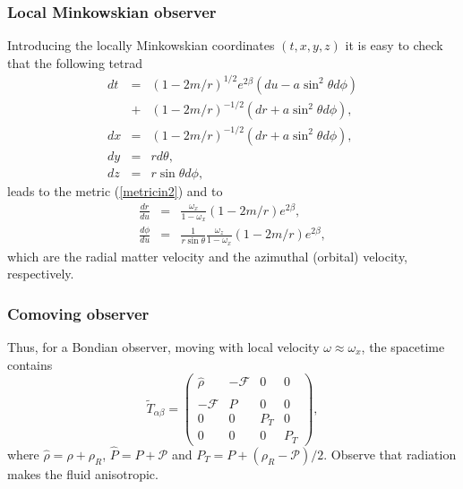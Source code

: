 \documentclass[twocolumn,superscriptaddress]{revtex4}
\begin{document}
\subsubsection{Local Minkowskian observer}
Introducing the locally Minkowskian coordinates $(t,x,y,z)$ it is easy to check that the following tetrad 
\begin{subequations}
\begin{eqnarray}
dt &=&(1-2m/r)^{1/2}e^{2\beta}(du-a\sin ^2\theta d\phi)\nonumber\\
&+& (1-2m/r)^{-1/2}(dr+a\sin ^2\theta d\phi),
\label{transform1} \\
dx &=&(1-2m/r)^{-1/2}(dr+{a\sin ^2\theta }d\phi), \label{transform2} \\
dy &=&r d\theta,  \label{transform3}\\
dz &=&r\sin \theta d\phi, \label{transform4}
\end{eqnarray}
\end{subequations}
leads to the metric (\ref{metricin2}) and to 
\begin{eqnarray}
\frac{dr}{du}&=&\frac{\omega_x}{1-\omega_x}(1-2m/r)e^{2\beta},\\
\label{radialv}
\frac{d\phi}{du}&=&\frac{1}{r\sin\theta}\frac{\omega_z}{1-\omega_x} {(1-2m/r)}e^{2\beta},
\label{orbitalv}
\end{eqnarray}
which are the radial matter velocity and the azimuthal (orbital) velocity, respectively.
\subsubsection{Comoving observer}
Thus, for a Bondian observer, moving with local velocity $\omega\approx\omega_x$, the spacetime contains
\begin{equation}
\tilde T_{\alpha\beta} =
\left(
\begin{array}{cccc}
 \hat\rho& -\mathcal{F}  & 0  &0\\
 -\mathcal{F} & \hat P  & 0 & 0\\
 0 & 0  & P_T & 0 \\
 0 &0& 0 &P_T
\end{array}
\right),
\end{equation}
where $\hat\rho=\rho +\rho_R$, $\hat P=P+\mathcal{P}$ and $P_T=P+(\rho_R-\mathcal{P})/2$. Observe that radiation makes the fluid anisotropic.
\end{document}

